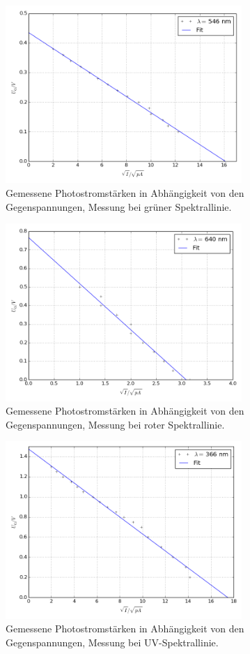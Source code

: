 \begin{figure}[p]
	\centering
	\includegraphics[width=0.8\textwidth]{Bilder/Fit_gruen.png}
	\caption{Gemessene Photostromstärken in Abhängigkeit von den Gegenspannungen, Messung bei grüner Spektrallinie.\cite{matplotlib}}
\end{figure}
\begin{figure}[p]
	\centering
	\includegraphics[width=0.8\textwidth]{Bilder/Fit_rot.png}
	\caption{Gemessene Photostromstärken in Abhängigkeit von den Gegenspannungen, Messung bei roter Spektrallinie.\cite{matplotlib}}
\end{figure}
\begin{figure}[p]
	\centering
	\includegraphics[width=0.8\textwidth]{Bilder/Fit_uv.png}
	\caption{Gemessene Photostromstärken in Abhängigkeit von den Gegenspannungen, Messung bei UV-Spektrallinie.\cite{matplotlib}}
\end{figure}
